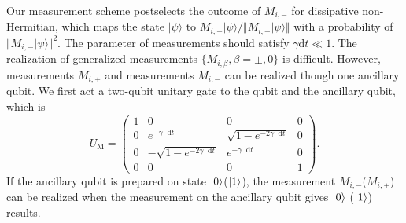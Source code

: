 \documentclass[longbibliography, aps, prx, amsmath, amssymb, amsfonts, twocolumn,superscriptaddress, footinbib]{revtex4-1}
\newcommand{\dif}{\mathop{}\!\mathrm{d}}
\begin{document}
	Our measurement scheme postselects the outcome of $M_{i,-}$ for dissipative non-Hermitian, which maps the state $\vert \psi \rangle$ to $M_{i,-} \vert \psi \rangle/\Vert M_{i,-} \vert \psi \rangle \Vert$ with a probability of $\Vert M_{i,-} \vert \psi \rangle \Vert^2$. 
	The parameter of measurements should satisfy $\gamma \mathrm{d} t \ll 1$.
	The realization of generalized measurements $\{M_{i,\beta}, \beta=\pm,0\}$ is difficult. However, measurements $M_{i,+}$ and measurements $M_{i,-}$ can be realized though one ancillary qubit. We first act a two-qubit unitary gate to the qubit and the ancillary qubit, which is
	\begin{equation}
		U_{\text{M}} = \begin{pmatrix}
		  1 & 0 & 0 & 0\\
		  0 & e^{-\gamma \dif t} & \sqrt{1-e^{-2 \gamma \dif t}} & 0\\
		  0 & -\sqrt{1-e^{-2 \gamma \dif t}} & e^{-\gamma \dif t} & 0\\
		  0 & 0 & 0 & 1
		\end{pmatrix}.
	\end{equation}
	If the ancillary qubit is prepared on state $\ket{0}$($\ket{1}$), the measurement $M_{i,-}$($M_{i,+}$) can be realized when the measurement on the ancillary qubit gives $\ket{0}$ ($\ket{1}$) results. 
\end{document}
